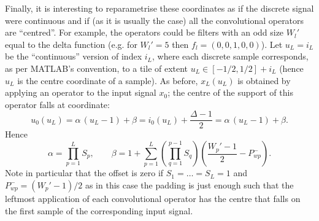 Finally, it is interesting to reparametrise these coordinates as if the discrete signal were continuous and if (as it is usually the case) all the convolutional operators are ``centred''. For example, the operators could be filters with an odd size $W_l'$ equal to the delta function (e.g. for $W_l'=5$ then $f_l = (0,0,1,0,0)$). Let $u_L = i_L$ be the ``continuous'' version of index $i_L$, where each discrete sample corresponds, as per MATLAB's convention, to a tile of extent $u_L \in [-1/2,1/2] + i_L$ (hence $u_L$ is the centre coordinate of a sample). As before, $x_L(u_L)$ is obtained by applying an operator to the input signal $x_0$; the centre of the support of this operator falls at coordinate:
\[
  u_0(u_L) = \alpha\, (u_L - 1) + \beta = i_0(u_L) + \frac{\Delta-1}{2} = \alpha\, (u_L - 1) + \beta.
\]
Hence
\[
\alpha = \prod_{p=1}^L S_p,
\qquad
\beta
 = 
1
+ 
\sum_{p = 1}^L  \left(\prod_{q=1}^{p-1} S_q\right)
\left(
\frac{W_p' - 1}{2}  - P_{wp}^-
\right).
\]
Note in particular that the offset is zero if $S_1 =\dots=S_L=1$ and $P_{wp}^- = (W_p'-1)/2$ as in this case the padding is just enough such that the leftmost application of each convolutional operator has the centre that falls on the first sample of the corresponding input signal.